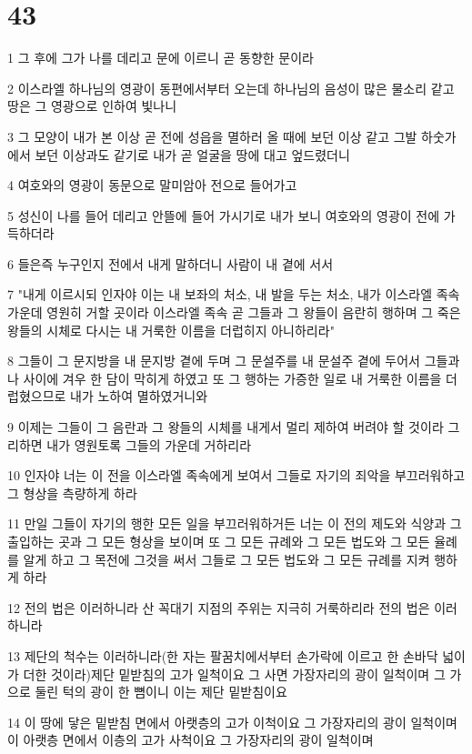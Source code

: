 \chapter{43}

\par 1 그 후에 그가 나를 데리고 문에 이르니 곧 동향한 문이라
\par 2 이스라엘 하나님의 영광이 동편에서부터 오는데 하나님의 음성이 많은 물소리 같고 땅은 그 영광으로 인하여 빛나니
\par 3 그 모양이 내가 본 이상 곧 전에 성읍을 멸하러 올 때에 보던 이상 같고 그발 하숫가에서 보던 이상과도 같기로 내가 곧 얼굴을 땅에 대고 엎드렸더니
\par 4 여호와의 영광이 동문으로 말미암아 전으로 들어가고
\par 5 성신이 나를 들어 데리고 안뜰에 들어 가시기로 내가 보니 여호와의 영광이 전에 가득하더라
\par 6 들은즉 누구인지 전에서 내게 말하더니 사람이 내 곁에 서서
\par 7 "내게 이르시되 인자야 이는 내 보좌의 처소, 내 발을 두는 처소, 내가 이스라엘 족속 가운데 영원히 거할 곳이라 이스라엘 족속 곧 그들과 그 왕들이 음란히 행하며 그 죽은 왕들의 시체로 다시는 내 거룩한 이름을 더럽히지 아니하리라"
\par 8 그들이 그 문지방을 내 문지방 곁에 두며 그 문설주를 내 문설주 곁에 두어서 그들과 나 사이에 겨우 한 담이 막히게 하였고 또 그 행하는 가증한 일로 내 거룩한 이름을 더럽혔으므로 내가 노하여 멸하였거니와
\par 9 이제는 그들이 그 음란과 그 왕들의 시체를 내게서 멀리 제하여 버려야 할 것이라 그리하면 내가 영원토록 그들의 가운데 거하리라
\par 10 인자야 너는 이 전을 이스라엘 족속에게 보여서 그들로 자기의 죄악을 부끄러워하고 그 형상을 측량하게 하라
\par 11 만일 그들이 자기의 행한 모든 일을 부끄러워하거든 너는 이 전의 제도와 식양과 그 출입하는 곳과 그 모든 형상을 보이며 또 그 모든 규례와 그 모든 법도와 그 모든 율례를 알게 하고 그 목전에 그것을 써서 그들로 그 모든 법도와 그 모든 규례를 지켜 행하게 하라
\par 12 전의 법은 이러하니라 산 꼭대기 지점의 주위는 지극히 거룩하리라 전의 법은 이러하니라
\par 13 제단의 척수는 이러하니라(한 자는 팔꿈치에서부터 손가락에 이르고 한 손바닥 넓이가 더한 것이라)제단 밑받침의 고가 일척이요 그 사면 가장자리의 광이 일척이며 그 가으로 둘린 턱의 광이 한 뼘이니 이는 제단 밑받침이요
\par 14 이 땅에 닿은 밑받침 면에서 아랫층의 고가 이척이요 그 가장자리의 광이 일척이며 이 아랫층 면에서 이층의 고가 사척이요 그 가장자리의 광이 일척이며
